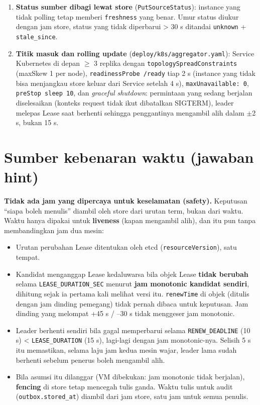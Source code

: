 \begin{enumerate}
\item \textbf{Status sumber dibagi lewat store} (\texttt{Put\allowbreak{}Source\allowbreak{}Status}): instance yang tidak polling tetap memberi \texttt{freshness} yang benar. Umur status diukur dengan jam store, status yang tidak diperbarui > 30 s ditandai \texttt{unknown} + \texttt{stale\_\allowbreak{}since}.
\item \textbf{Titik masuk dan rolling update} (\texttt{deploy/\allowbreak{}k8s/\allowbreak{}aggregator.\allowbreak{}yaml}): Service Kubernetes di depan $\ge$ 3 replika dengan \texttt{topology\allowbreak{}Spread\allowbreak{}Constraints} (maxSkew 1 per node), \texttt{readiness\allowbreak{}Probe /\allowbreak{}ready} tiap 2 s (instance yang tidak bisa menjangkau store keluar dari Service setelah 4 s), \texttt{max\allowbreak{}Unavailable: 0}, \texttt{pre\allowbreak{}Stop sleep 10}, dan \emph{graceful shutdown}: permintaan yang sedang berjalan diselesaikan (konteks request tidak ikut dibatalkan SIGTERM), leader melepas Lease saat berhenti sehingga penggantinya mengambil alih dalam $\pm$2 s, bukan 15 s.
\end{enumerate}

\section{Sumber kebenaran waktu (jawaban hint)}

\textbf{Tidak ada jam yang dipercaya untuk keselamatan (safety).} Keputusan ``siapa boleh menulis'' diambil oleh store dari urutan term, bukan dari waktu. Waktu hanya dipakai untuk \textbf{liveness} (kapan mengambil alih), dan itu pun tanpa membandingkan jam dua mesin:


\begin{itemize}
\item Urutan perubahan Lease ditentukan oleh etcd (\texttt{resource\allowbreak{}Version}), satu tempat.
\item Kandidat menganggap Lease kedaluwarsa bila objek Lease \textbf{tidak berubah} selama \texttt{LEASE\_\allowbreak{}DURATION\_\allowbreak{}SEC} menurut \textbf{jam monotonic kandidat sendiri}, dihitung sejak ia pertama kali melihat versi itu. \texttt{renew\allowbreak{}Time} di objek (ditulis dengan jam dinding pemegang) tidak pernah dibaca untuk keputusan. Jam dinding yang melompat +45 s / --30 s tidak menggeser jam monotonic.
\item Leader berhenti sendiri bila gagal memperbarui selama \texttt{RENEW\_\allowbreak{}DEADLINE} (10 s) < \texttt{LEASE\_\allowbreak{}DURATION} (15 s), lagi-lagi dengan jam monotonic-nya. Selisih 5 s itu memastikan, selama laju jam kedua mesin wajar, leader lama sudah berhenti sebelum penerus boleh mengambil alih.
\item Bila asumsi itu dilanggar (VM dibekukan: jam monotonic tidak berjalan), \textbf{fencing} di store tetap mencegah tulis ganda. Waktu tulis untuk audit (\texttt{outbox.\allowbreak{}stored\_\allowbreak{}at}) diambil dari jam store, satu jam untuk semua penulis.
\end{itemize}

